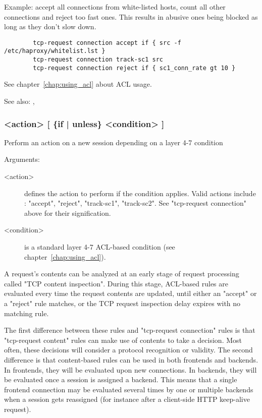 {  Example: accept all connections from white-listed hosts, count all other
           connections and reject too fast ones. This results in abusive ones
           being blocked as long as they don't slow down.

  \begin{verbatim}
        tcp-request connection accept if { src -f /etc/haproxy/whitelist.lst }
        tcp-request connection track-sc1 src
        tcp-request connection reject if { sc1_conn_rate gt 10 }
  \end{verbatim}

  See chapter~\ref{chap:using_acl} about ACL usage.

  See also: , 

\subsubsection[tcp-request content]{ <action> [ \{if | unless\} <condition> ]}

  Perform an action on a new session depending on a layer 4-7 condition


  Arguments:
  \begin{description}
  \item[<action>] defines the action to perform if the condition applies. Valid
                actions include : "accept", "reject", "track-sc1", "track-sc2".
                See "tcp-request connection" above for their signification.

  \item[<condition>] is a standard layer 4-7 ACL-based condition (see chapter~\ref{chap:using_acl}).
  \end{description}

  A request's contents can be analyzed at an early stage of request processing
  called "TCP content inspection". During this stage, ACL-based rules are
  evaluated every time the request contents are updated, until either an
  "accept" or a "reject" rule matches, or the TCP request inspection delay
  expires with no matching rule.

  The first difference between these rules and "tcp-request connection" rules
  is that "tcp-request content" rules can make use of contents to take a
  decision. Most often, these decisions will consider a protocol recognition or
  validity. The second difference is that content-based rules can be used in
  both frontends and backends. In frontends, they will be evaluated upon new
  connections. In backends, they will be evaluated once a session is assigned
  a backend. This means that a single frontend connection may be evaluated
  several times by one or multiple backends when a session gets reassigned
  (for instance after a client-side HTTP keep-alive request).

}
